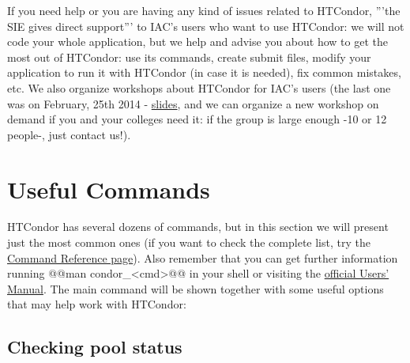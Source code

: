 \documentclass[a4paper,10pt]{article}
\begin{document}
If you need help or you are having any kind of issues related to HTCondor,
'''the SIE gives direct support''' to IAC's users who want to use HTCondor: we
will not code your whole application, but we help and advise you about how to
get the most out of HTCondor: use its commands, create submit files, modify your
application to run it with HTCondor (in case it is needed), fix common mistakes,
etc. We also organize workshops about HTCondor for IAC's users (the last one was
on February, 25th 2014 - \href{https://docs.google.com/presentation/d/1PqCih4yL6D3FOFo0W336RjLCKrSICZbYuPX1F1CZqtQ/present\#slide=id.p}{slides}, and we can organize a new workshop on demand if
you and your colleges need it: if the group is large enough -10 or 12 people-,
just contact us!).

\section{Useful Commands}
\label{sec:orgf9ca571}

HTCondor has several dozens of commands, but in this section we will present
just the most common ones (if you want to check the complete list, try the
\href{http://research.cs.wisc.edu/htcondor/manual/v8.6/11\_Command\_Reference.html}{Command Reference page}). Also remember that you can get further information
running @@man condor\_<cmd>@@ in your shell or visiting the \href{http://research.cs.wisc.edu/htcondor/manual/v8.6/2\_Users\_Manual.html}{official Users'
Manual}. The main command will be shown together with some useful options that
may help work with HTCondor:


\subsection{Checking pool status}
\label{sec:org05fa071}
\end{document}
